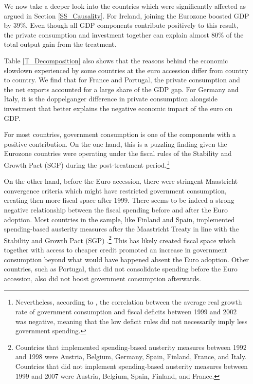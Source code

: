 \documentclass[12pt]{article}
\begin{document}
We now take a deeper look into the countries which were significantly affected as argued in Section \ref{SS_Causality}. For Ireland, joining the Eurozone boosted GDP by 39\%. Even though all GDP components contribute positively to this result, the private consumption and investment together can explain almost 80\% of the total output gain from the treatment.

Table \ref{T_Decomposition} also shows that the reasons behind the economic slowdown experienced by some countries at the euro accession differ from country to country. We find that for France and Portugal, the private consumption and the net exports accounted for a large share of the GDP gap. For Germany and Italy, it is the doppelganger difference in private consumption alongside investment that better explains the negative economic impact of the euro on GDP.

For most countries, government consumption is one of the components with a positive contribution. On the one hand, this is a puzzling finding given the Eurozone countries were operating under the fiscal rules of the Stability and Growth Pact (SGP) during the post-treatment period.\footnote{Nevertheless, according to \cite{Bofinger2003}, the correlation between the average real growth rate of government consumption and fiscal deficits between 1999 and 2002 was negative, meaning that the low deficit rules did not necessarily imply less government spending.} 

On the other hand, before the Euro accession, there were stringent Maastricht convergence criteria which might have restricted government consumption, creating then more fiscal space after 1999. There seems to be indeed a strong negative relationship between the fiscal spending before and after the Euro adoption. Most countries in the sample, like Finland and Spain, implemented spending-based austerity measures after the Maastricht Treaty in line with the Stability and Growth Pact (SGP) \citep{Alesina2019}.\footnote{Countries that implemented spending-based austerity measures between 1992 and 1998 were Austria, Belgium, Germany, Spain, Finland, France, and Italy. Countries that did not implement spending-based austerity measures between 1999 and 2007 were Austria, Belgium, Spain, Finland, and France.} This has likely created fiscal space which together with access to cheaper credit promoted an increase in government consumption beyond what would have happened absent the Euro adoption. Other countries, such as Portugal, that did not consolidate spending before the Euro accession, also did not boost government consumption afterwards. 
\end{document}
